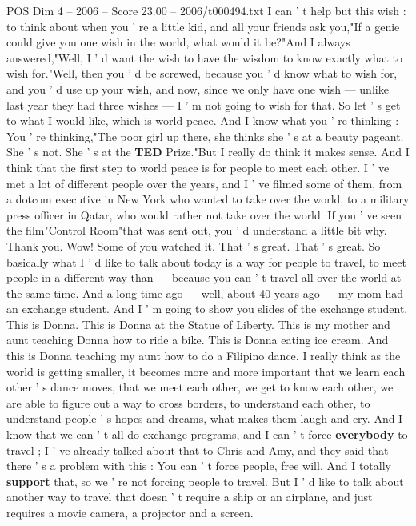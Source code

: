 \begin{textsample}{POS Dim 4 – 2006 – Score 23.00 – 2006/t000494.txt}  \label{ex:f4_pos_006}
I can ' t help but this wish : to think about when you ' re a little kid, and all your friends ask you,"If a genie could give you one wish in the world, what would it be?"And I always answered,"Well, I ' d want the wish to have the wisdom to know exactly what to wish for."Well, then you ' d be screwed, because you ' d know what to wish for, and you ' d use up your wish, and now, since we only have one wish — unlike last year they had three wishes — I ' m not going to wish for that.
So let ' s get to what I would like, which is world peace.
And I know what you ' re thinking : You ' re thinking,"The poor girl up there, she thinks she ' s at a beauty pageant.
She ' s not.
She ' s at the \textbf{TED} Prize."But I really do think it makes sense.
And I think that the first step to world peace is for people to meet each other.
I ' ve met a lot of different people over the years, and I ' ve filmed some of them, from a dotcom executive in New York who wanted to take over the world, to a military press officer in Qatar, who would rather not take over the world.
If you ' ve seen the film"Control Room"that was sent out, you ' d understand a little bit why.
Thank you.
Wow!
Some of you watched it.
That ' s great.
That ' s great.
So basically what I ' d like to talk about today is a way for people to travel, to meet people in a different way than — because you can ' t travel all over the world at the same time.
And a long time ago — well, about 40 years ago — my mom had an exchange student.
And I ' m going to show you slides of the exchange student.
This is Donna.
This is Donna at the Statue of Liberty.
This is my mother and aunt teaching Donna how to ride a bike.
This is Donna eating ice cream.
And this is Donna teaching my aunt how to do a Filipino dance.
I really think as the world is getting smaller, it becomes more and more important that we learn each other ' s dance moves, that we meet each other, we get to know each other, we are able to figure out a way to cross borders, to understand each other, to understand people ' s hopes and dreams, what makes them laugh and cry.
And I know that we can ' t all do exchange programs, and I can ' t force \textbf{everybody} to travel ; I ' ve already talked about that to Chris and Amy, and they said that there ' s a problem with this : You can ' t force people, free will.
And I totally \textbf{support} that, so we ' re not forcing people to travel.
But I ' d like to talk about another way to travel that doesn ' t require a ship or an airplane, and just requires a movie camera, a projector and a screen.

\end{textsample}
